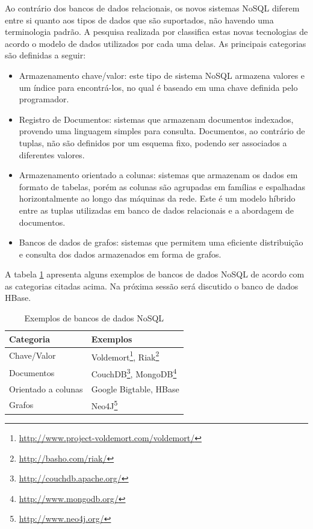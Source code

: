 Ao contrário dos bancos de dados relacionais, os novos sistemas NoSQL diferem entre si quanto aos tipos de dados que são suportados, não havendo uma terminologia padrão. A pesquisa realizada por  classifica estas novas tecnologias de acordo o modelo de dados utilizados por cada uma delas. As principais categorias são definidas a seguir:

\begin{itemize}

  \item{Armazenamento chave/valor: este tipo de sistema NoSQL armazena valores e um índice para encontrá-los, no qual é baseado em uma chave definida pelo programador.}
  \item{Registro de Documentos: sistemas que armazenam documentos indexados, provendo uma linguagem simples para consulta. Documentos, ao contrário de tuplas, não são definidos por um esquema fixo, podendo ser associados a diferentes valores.}
  \item{Armazenamento orientado a colunas: sistemas que armazenam os dados em formato de tabelas, porém as colunas são agrupadas em famílias e espalhadas horizontalmente ao longo das máquinas da rede. Este é um modelo híbrido entre as tuplas utilizadas em banco de dados relacionais e a abordagem de documentos.}
  \item{Bancos de dados de grafos: sistemas que permitem uma eficiente distribuição e consulta dos dados armazenados em forma de grafos.}

\end{itemize}

A tabela \ref{tab-nosql} apresenta alguns exemplos de bancos de dados NoSQL de acordo com as categorias citadas acima. Na próxima sessão será discutido o banco de dados HBase.

\begin{savenotes}
\begin{table}[!ht]
\begin{center}
  \begin{tabular}{|p{5cm}|p{3cm}|}
	\hline
	Categoria & Exemplos
	\\ \hline
	Chave/Valor & Voldemort\footnote{\url{http://www.project-voldemort.com/voldemort/}}, Riak\footnote{\url{http://basho.com/riak/}}
	\\ \hline
	Documentos & CouchDB\footnote{\url{http://couchdb.apache.org/}}, MongoDB\footnote{\url{http://www.mongodb.org/}}
	\\ \hline
	Orientado a colunas & Google Bigtable, HBase
	\\ \hline
	Grafos & Neo4J\footnote{\url{http://www.neo4j.org/}}
	\\ \hline
  \end{tabular}
  \caption{Exemplos de bancos de dados NoSQL}
\label{tab-nosql}
\end{center}
\end{table}
\end{savenotes}
\FloatBarrier

